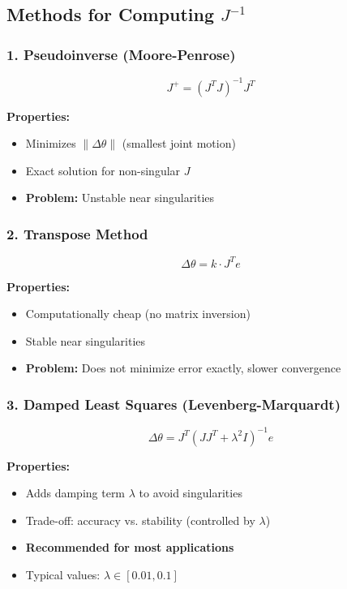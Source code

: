 \documentclass[11pt,a4paper]{article}
\begin{document}
\subsection{Methods for Computing $J^{-1}$}

\subsubsection{1. Pseudoinverse (Moore-Penrose)}

\begin{equation}
J^+ = (J^T J)^{-1} J^T
\end{equation}

\textbf{Properties:}
\begin{itemize}
    \item Minimizes $\|\Delta\theta\|$ (smallest joint motion)
    \item Exact solution for non-singular $J$
    \item \textbf{Problem:} Unstable near singularities
\end{itemize}

\subsubsection{2. Transpose Method}

\begin{equation}
\Delta\theta = k \cdot J^T e
\end{equation}

\textbf{Properties:}
\begin{itemize}
    \item Computationally cheap (no matrix inversion)
    \item Stable near singularities
    \item \textbf{Problem:} Does not minimize error exactly, slower convergence
\end{itemize}

\subsubsection{3. Damped Least Squares (Levenberg-Marquardt)}

\begin{equation}
\Delta\theta = J^T (J J^T + \lambda^2 I)^{-1} e
\end{equation}

\textbf{Properties:}
\begin{itemize}
    \item Adds damping term $\lambda$ to avoid singularities
    \item Trade-off: accuracy vs. stability (controlled by $\lambda$)
    \item \textbf{Recommended for most applications}
    \item Typical values: $\lambda \in [0.01, 0.1]$
\end{itemize}
\end{document}
